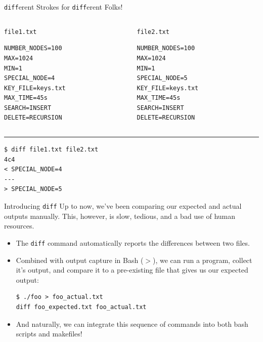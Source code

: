 \documentclass[11pt]{beamer}
\begin{document}
\begin{frame}[fragile=singleslide]{\texttt{diff}erent Strokes for \texttt{diff}erent Folks!}
\begin{columns}
\begin{column}{0.5\textwidth}
\center
\texttt{file1.txt}
\begin{lstlisting}[style=C]
NUMBER_NODES=100
MAX=1024
MIN=1
SPECIAL_NODE=4
KEY_FILE=keys.txt
MAX_TIME=45s
SEARCH=INSERT
DELETE=RECURSION
\end{lstlisting}
\end{column}
\begin{column}{0.5\textwidth}
\center
\texttt{file2.txt}
\begin{lstlisting}[style=C]
NUMBER_NODES=100
MAX=1024
MIN=1
SPECIAL_NODE=5
KEY_FILE=keys.txt
MAX_TIME=45s
SEARCH=INSERT
DELETE=RECURSION
\end{lstlisting}
\end{column}
\end{columns}
\hrule
\begin{lstlisting}[style=terminal]
$ diff file1.txt file2.txt
4c4
< SPECIAL_NODE=4
---
> SPECIAL_NODE=5
\end{lstlisting}
\end{frame}



\begin{frame}[fragile=singleslide]{Introducing \texttt{diff}}
Up to now, we've been comparing our expected and actual outputs manually.  This, however, is slow, tedious, and a bad use of human resources.  
\begin{itemize}
\item The \texttt{diff} command automatically reports the differences between two files.  
\item Combined with output capture in Bash ($>$), we can run a program, collect it's output, and compare it to a pre-existing file that gives us our expected output:
\begin{lstlisting}[style=terminal]
$ ./foo > foo_actual.txt
diff foo_expected.txt foo_actual.txt
\end{lstlisting}
\item And naturally, we can integrate this sequence of commands into both bash scripts and makefiles! 
\end{itemize}
\end{frame}
\end{document}
